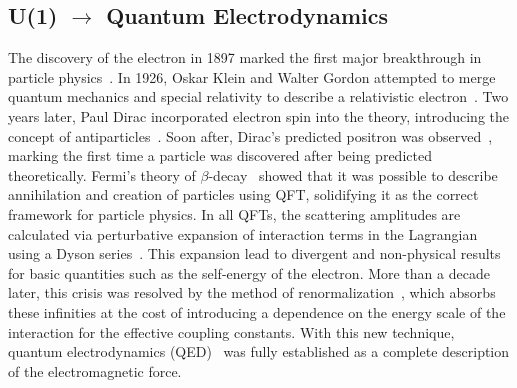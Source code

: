\subsection{U(1) \texorpdfstring{$\rightarrow$}{-} Quantum Electrodynamics}

The discovery of the electron in 1897 marked the first major breakthrough in particle physics~\cite{ThomsonElectron}.
In 1926, Oskar Klein and Walter Gordon attempted to merge quantum mechanics and special relativity to describe a relativistic electron~\cite{Klein1926,Gordon1926}.
Two years later, Paul Dirac incorporated electron spin into the theory, introducing the concept of antiparticles~\cite{Dirac1928}.
Soon after, Dirac's predicted positron was observed~\cite{PositiveElectron}, marking the first time a particle was discovered after being predicted theoretically.
Fermi's theory of $\beta$-decay~\cite{Fermi1934} showed that it was possible to describe annihilation and creation of particles using QFT\@, solidifying it as the correct framework for particle physics.
In all QFTs, the scattering amplitudes are calculated via perturbative expansion of interaction terms in the Lagrangian using a Dyson series~\cite{AlexQED4}.
This expansion lead to divergent and non-physical results for basic quantities such as the self-energy of the electron.
More than a decade later, this crisis was resolved by the method of renormalization~\cite{Renorm1,Renorm2,Renorm3,Renorm4,Renorm5,Renorm6,Renorm7,Renorm8,Renorm9,Renorm10,Renorm11,Renorm12}, which absorbs these infinities at the cost of introducing a dependence on the energy scale of the interaction for the effective coupling constants.
With this new technique, quantum electrodynamics (QED)~\cite{AlexQED1,AlexQED2,AlexQED3} was fully established as a complete description of the electromagnetic force.

